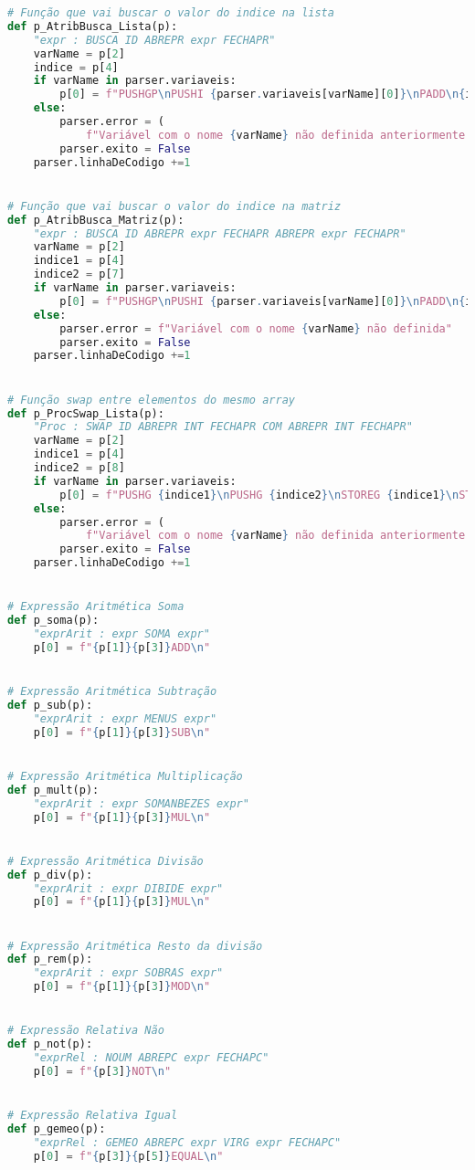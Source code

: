 \documentclass[11pt,a4paper]{report}%
\begin{document}
\begin{scriptsize}
\begin{lstlisting}[language=python]
# Função que vai buscar o valor do indice na lista
def p_AtribBusca_Lista(p):
    "expr : BUSCA ID ABREPR expr FECHAPR"
    varName = p[2]
    indice = p[4]
    if varName in parser.variaveis:
        p[0] = f"PUSHGP\nPUSHI {parser.variaveis[varName][0]}\nPADD\n{indice}LOADN\n"
    else:
        parser.error = (
            f"Variável com o nome {varName} não definida anteriormente.")
        parser.exito = False
    parser.linhaDeCodigo +=1


# Função que vai buscar o valor do indice na matriz
def p_AtribBusca_Matriz(p):
    "expr : BUSCA ID ABREPR expr FECHAPR ABREPR expr FECHAPR"
    varName = p[2]
    indice1 = p[4]
    indice2 = p[7]
    if varName in parser.variaveis:
        p[0] = f"PUSHGP\nPUSHI {parser.variaveis[varName][0]}\nPADD\n{indice1}PUSHI {parser.variaveis[varName][2]}\nMUL\nPADD\n{indice2}LOADN\n"
    else:
        parser.error = f"Variável com o nome {varName} não definida"
        parser.exito = False
    parser.linhaDeCodigo +=1


# Função swap entre elementos do mesmo array
def p_ProcSwap_Lista(p):
    "Proc : SWAP ID ABREPR INT FECHAPR COM ABREPR INT FECHAPR"
    varName = p[2]
    indice1 = p[4]
    indice2 = p[8]
    if varName in parser.variaveis:
        p[0] = f"PUSHG {indice1}\nPUSHG {indice2}\nSTOREG {indice1}\nSTOREG {indice2}\n"
    else:
        parser.error = (
            f"Variável com o nome {varName} não definida anteriormente.")
        parser.exito = False
    parser.linhaDeCodigo +=1


# Expressão Aritmética Soma
def p_soma(p):
    "exprArit : expr SOMA expr"
    p[0] = f"{p[1]}{p[3]}ADD\n"


# Expressão Aritmética Subtração
def p_sub(p):
    "exprArit : expr MENUS expr"
    p[0] = f"{p[1]}{p[3]}SUB\n"


# Expressão Aritmética Multiplicação
def p_mult(p):
    "exprArit : expr SOMANBEZES expr"
    p[0] = f"{p[1]}{p[3]}MUL\n"


# Expressão Aritmética Divisão
def p_div(p):
    "exprArit : expr DIBIDE expr"
    p[0] = f"{p[1]}{p[3]}MUL\n"


# Expressão Aritmética Resto da divisão
def p_rem(p):
    "exprArit : expr SOBRAS expr"
    p[0] = f"{p[1]}{p[3]}MOD\n"


# Expressão Relativa Não
def p_not(p):
    "exprRel : NOUM ABREPC expr FECHAPC"
    p[0] = f"{p[3]}NOT\n"


# Expressão Relativa Igual
def p_gemeo(p):
    "exprRel : GEMEO ABREPC expr VIRG expr FECHAPC"
    p[0] = f"{p[3]}{p[5]}EQUAL\n"



\end{lstlisting}
\end{scriptsize}
\end{document}

